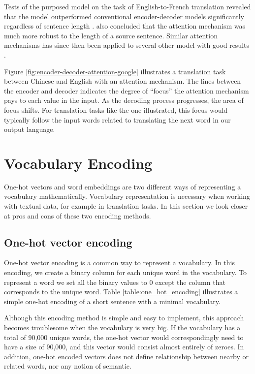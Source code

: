 Tests of the purposed model on the task of English-to-French translation revealed that the model outperformed conventional encoder-decoder models significantly regardless of sentence length \citep{bahdanau2014neural}. \citep{bahdanau2014neural} also concluded that the attention mechanism was much more robust to the length of a source sentence. Similar attention mechanisms has since then been applied to several other model with good results \citep{hsu2016recurrent, sankaran2016temporal}. 

Figure \ref{fig:encoder-decoder-attention-google} illustrates a translation task between Chinese and English with an attention mechanism. The lines between the encoder and decoder indicates the degree of ``focus'' the attention mechanism pays to each value in the input. As the decoding process progresses, the area of focus shifts. For translation tasks like the one illustrated, this focus would typically follow the input words related to translating the next word in our output language.


\section{Vocabulary Encoding}
\label{sec:vocabulary_encoding}
One-hot vectors and word embeddings are two different ways of representing a vocabulary mathematically. Vocabulary representation is necessary when working with textual data, for example in translation tasks. In this section we look closer at pros and cons of these two encoding methods.

\subsection{One-hot vector encoding}
One-hot vector encoding is a common way to represent a vocabulary. In this encoding, we create a binary column for each unique word in the vocabulary. To represent a word we set all the binary values to \(0\) except the column that corresponds to the unique word. Table  \ref{table:one_hot_encoding} illustrates a simple one-hot encoding of a short sentence with a minimal vocabulary. 

Although this encoding method is simple and easy to implement, this approach becomes troublesome when the vocabulary is very big. If the vocabulary has a total of 90,000 unique words, the one-hot vector would correspondingly need to have a size of 90,000, and this vector would consist almost entirely of zeroes. In addition, one-hot encoded vectors does not define relationship between nearby or related words, nor any notion of semantic.

